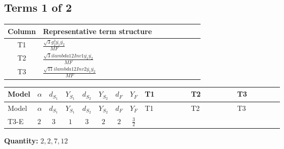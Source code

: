 \documentclass[8pt]{article}
\begin{document}
\begin{landscape}
\subsection*{Terms 1 of 2}
\begin{center}
\begin{tabular}{@{}c >{\raggedright\arraybackslash}p{0.82\linewidth}@{}}
\toprule
Column & Representative term structure \\
\midrule
T1 & \(\displaystyle \frac{\sqrt{3} g_{2}^{2} \overline{y_{1}} \overline{y_{2}}}{MF}\) \\
\midrule
T2 & \(\displaystyle \frac{\sqrt{3} i lambda12Inv1 \overline{y_{1}} \overline{y_{2}}}{MF}\) \\
\midrule
T3 & \(\displaystyle \frac{\sqrt{11} i lambda12Inv2 \overline{y_{1}} \overline{y_{2}}}{MF}\) \\
\midrule
\bottomrule
\end{tabular}
\end{center}
\smallskip
\tiny
\begin{longtable}{@{}llcccccc >{\raggedright\arraybackslash}p{0.21\linewidth} >{\raggedright\arraybackslash}p{0.21\linewidth} >{\raggedright\arraybackslash}p{0.21\linewidth}@{}}
\toprule
Model & $\alpha$ & $d_{S_1}$ & $Y_{S_1}$ & $d_{S_2}$ & $Y_{S_2}$ & $d_F$ & $Y_F$ & T1 & T2 & T3 \\
\midrule
\endfirsthead
\toprule
Model & $\alpha$ & $d_{S_1}$ & $Y_{S_1}$ & $d_{S_2}$ & $Y_{S_2}$ & $d_F$ & $Y_F$ & T1 & T2 & T3 \\
\midrule
\endhead
T3-E & $2$ & $3$ & $1$ & $3$ & $2$ & $2$ & $\frac{3}{2}$ & \scriptsize\adjustbox{max width=\linewidth}{$\begin{gathered} \frac{\sqrt{3} g_{2}^{2} \overline{y_{1}} \overline{y_{2}}}{6 MF}\end{gathered}$} & \scriptsize\adjustbox{max width=\linewidth}{$\begin{gathered} - \frac{\sqrt{3} i lambda12Inv1 \overline{y_{1}} \overline{y_{2}}}{6 MF}\end{gathered}$} & \scriptsize\adjustbox{max width=\linewidth}{$\begin{gathered} \frac{3 \sqrt{11} i lambda12Inv2 \overline{y_{1}} \overline{y_{2}}}{22 MF}\end{gathered}$} \\
\midrule
\bottomrule
\end{longtable}
\clearpage
\noindent\textbf{Quantity: }$\mathrm{2,2,7,12}$\par\smallskip

\end{landscape}
\end{document}

